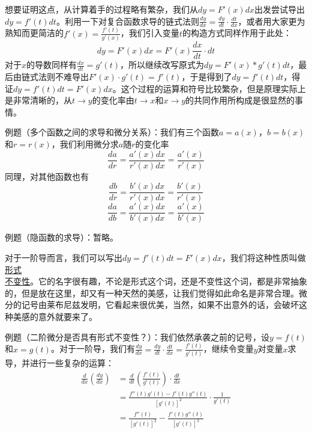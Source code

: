 \documentclass[fontset=none]{ctexart}
\begin{document}
想要证明这点，从计算着手的过程略有繁杂，我们从$dy=F'(x)dx$出发尝试导出$dy=f'(t)dt$。利用一下对复合函数求导的链式法则$\frac{dy}{dx}=\frac{dy}{dt}\cdot \frac{dt}{dx}$，或者用大家更为熟知而更简洁的$f'(x)=\frac{f'\left( t \right)}{g'\left( x \right)}$，我们引入变量$t$的构造方式同样作用于此处：
\begin{equation}
    dy=F'(x)dx=F'(x)\frac{dx}{dt}\cdot dt
\end{equation}
对于$x$的导数同样有$\frac{dx}{dt}=g'(t)$，所以继续改写原式为$dy=F'(x)*g'(t)dt$，最后由链式法则不难导出$F'(x)\cdot g'(t)=f'(t)$，于是得到了$dy=f'(t)dt$，得证$dy=f'(t)dt=F'(x)dx$。这个过程的运算和符号比较繁杂，但是原理实际上是非常清晰的，从$t\to y$的变化率由$t\to x$和$x\to y$的共同作用所构成是很显然的事情。

\lishu 例题（多个函数之间的求导和微分关系）：我们有三个函数$a=a(x)$，$b=b(x)$和$r=r(x)$，我们利用微分求$a$随$r$的变化率$$
\frac{da}{dr}=\frac{a'\left( x \right) dx}{r'\left( x \right) dx}=\frac{a'\left( x \right)}{r'\left( x \right)}
$$同理，对其他函数也有$$
\frac{db}{dr}=\frac{b'\left( x \right) dx}{r'\left( x \right) dx}=\frac{b'\left( x \right)}{r'\left( x \right)}
$$ $$
\frac{da}{db}=\frac{a'\left( x \right) dx}{b'\left( x \right) dx}=\frac{a'\left( x \right)}{b'\left( x \right)}
$$

例题（隐函数的求导）：暂略。

\songti 对于一阶导而言，我们可以写出$dy=f'(t)dt=F'(x)dx$，我们将这种性质叫做\underline{形式\\不变性}。它的名字很有趣，不论是形式这个词，还是不变性这个词，都是非常抽象的，但是放在这里，却又有一种天然的美感，让我们觉得如此命名是非常合理。微分的记号由莱布尼兹发明，它看起来很优美，当然，如果不出意外的话，会破坏这种美感的意外就要来了。

\lishu 例题（二阶微分是否具有形式不变性？）：我们依然承袭之前的记号，设$y=f(t)$和$x=g(t)$。对于一阶导，我们有$\frac{dy}{dx}=\frac{dy}{dt}\cdot \frac{dt}{dx}=\frac{f'\left( t \right)}{g'\left( t \right)}$，继续令变量$y$对变量$x$求导，并进行一些复杂的运算：
\begin{align*}
    \frac{d}{dx}\left( \frac{dy}{dx} \right) &= \frac{d}{dt}\left( \frac{f'\left( t \right)}{g'\left( t \right)} \right) \cdot \frac{dt}{dx}
    \\&= \frac{f''\left( t \right) g'\left( t \right) -f'\left( t \right) g''\left( t \right)}{\left[ g'\left( t \right) \right] ^2}\cdot \frac{1}{g'\left( t \right)}
    \\&= \frac{f''\left( t \right)}{\left[ g'\left( t \right) \right] ^2}-\frac{f'\left( t \right) g''\left( t \right)}{\left[ g'\left( t \right) \right] ^3}
\end{align*}
\end{document}
